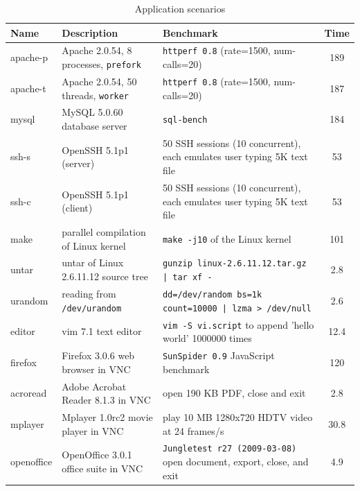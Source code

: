 \begin{table}[t]
\begin{center}
\small
\begin{tabular}{|l|l|l|c|}   \hline\hline
\bf{Name} & \bf{Description} & {\bf Benchmark} & {\bf Time} \\
\hline\hline 
apache-p    & Apache 2.0.54, 8 processes, {\tt prefork}
	&  {\tt httperf 0.8} (rate=1500, num-calls=20)
	&  189\secs \\
\hline
apache-t    & Apache 2.0.54, 50 threads, {\tt worker}
	&  {\tt httperf 0.8} (rate=1500, num-calls=20)
	&  187\secs \\
\hline
mysql       & MySQL 5.0.60 database server
	&  {\tt sql-bench}
	&  184\secs \\
\hline
ssh-s       & OpenSSH 5.1p1 (server)
	&  50 SSH sessions (10 concurrent), each emulates user typing 5K
	text file
	&  53\secs \\
\hline
ssh-c       & OpenSSH 5.1p1 (client)
	&  50 SSH sessions (10 concurrent), each emulates user typing 5K
	text file
	&  53\secs \\
\hline
make        & parallel compilation of Linux kernel
	&  {\tt make -j10} of the Linux kernel
	&  101\secs \\
\hline
untar       & untar of Linux 2.6.11.12 source tree
	&  {\tt gunzip linux-2.6.11.12.tar.gz | tar xf -}
	&  2.8\secs \\
\hline
urandom     & reading from {\tt /dev/urandom}
	&  {\tt dd=/dev/random bs=1k count=10000 | lzma > /dev/null}
	&  2.6\secs \\
\hline
editor      & vim 7.1 text editor
	&  {\tt vim -S vi.script} to append 'hello world' 1000000 times
	&  12.4\secs \\
\hline
firefox     & Firefox 3.0.6 web browser in VNC
	&  {\tt SunSpider 0.9} JavaScript benchmark
	&  120\secs \\
\hline
acroread   & Adobe Acrobat Reader 8.1.3 in VNC
	&  open 190 KB PDF, close and exit 
	&  2.8\secs \\
\hline
mplayer    & Mplayer 1.0rc2 movie player in VNC
	&  play 10 MB 1280x720 HDTV video at 24 frames/s
	&  30.8\secs \\
\hline
openoffice  & OpenOffice 3.0.1 office suite in VNC
	&  {\tt Jungletest r27 (2009-03-08)} open document, export, close, and exit
	&  4.9\secs \\
\hline\hline
\end{tabular}
\vskip -3mm
\caption{Application scenarios}
\label{scribe:tab:scenarios}
\end{center}
\vskip -0.25in
\end{table}


